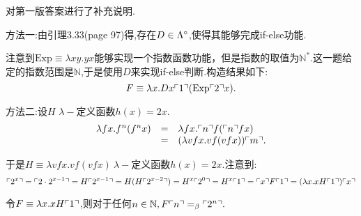 \begin{solution}

{\color {red} {对第一版答案进行了补充说明.}}

方法一:由引理3.33(page 97)得,存在$D\in\Lambda^\circ$,使得其能够完成if-else功能.

注意到$\mathrm{Exp} \equiv \lambda xy.yx $能够实现一个指数函数功能，但是指数的取值为$\mathbb{N}^{*}$.这一题给定的指数范围是$\mathbb{N}$,于是使用$D$来实现if-else判断.构造结果如下:
    $$F\equiv \lambda x.Dx\ulcorner{1}\urcorner(\mathrm{Exp}\ulcorner{2}\urcorner x).$$
    
方法二:设$H$ $\lambda-$定义函数$h(x)=2x$.
\[
 \begin{array}{rcl}
  \lambda fx. f^n (f^n x) & = & \lambda fx. \ulcorner{n}\urcorner f (\ulcorner{n}\urcorner f x) \\
  & = & (\lambda vfx. vf (vf x))\ulcorner{m}\urcorner .
 \end{array}
\]

于是$H \equiv \lambda vfx.vf(vfx) \  \lambda-$定义函数$h(x)=2x$.注意到:
$$\ulcorner{2^x}\urcorner = \ulcorner{2 \cdot 2^{x-1}}\urcorner = H\ulcorner{2^{x-1}}\urcorner=H(H\ulcorner{2^{x-2}}\urcorner)=H^x\ulcorner{2^{0}}\urcorner=H^x\ulcorner{1}\urcorner=\ulcorner{x}\urcorner F\ulcorner{1}\urcorner=(\lambda x.xH\ulcorner{1}\urcorner)\ulcorner{x}\urcorner$$

令$F\equiv \lambda x.xH\ulcorner{1}\urcorner$,则对于任何$n\in\mathbb{N},F\ulcorner{n}\urcorner=_{\beta}\ulcorner{2^n}\urcorner.$

\end{solution}